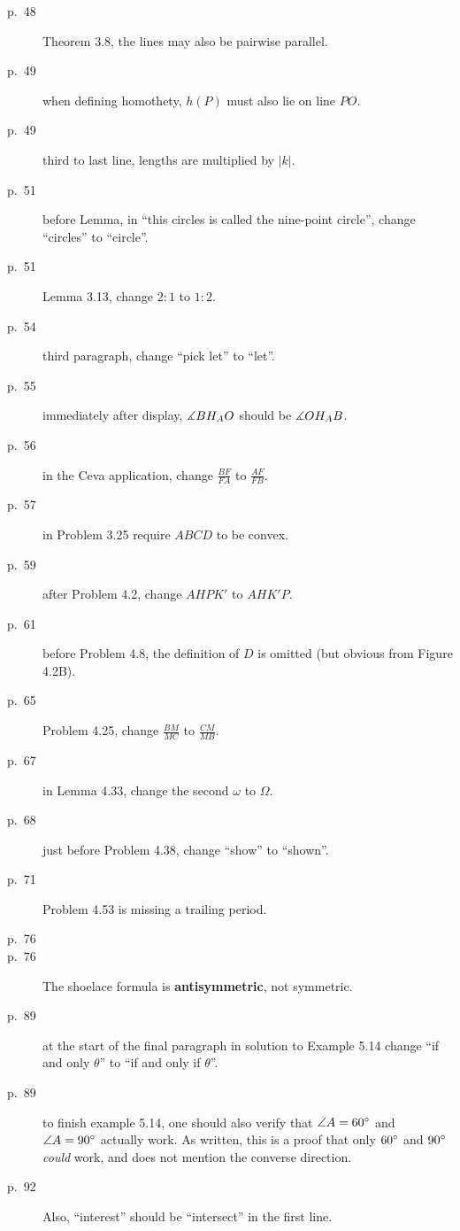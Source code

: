 \documentclass[11pt]{scrartcl}
\begin{document}
\begin{description}
\item[p.\  48] Theorem 3.8, the lines may also be pairwise parallel.
\item[p.\  49] when defining homothety, $h(P)$ must also lie on line $PO$.
\item[p.\  49] third to last line, lengths are multiplied by $|k|$.
\item[p.\  51] before Lemma, in ``this circles is called the nine-point circle'',
  change ``circles'' to ``circle''.
\item[p.\  51] Lemma 3.13, change $2:1$ to $1:2$.
\item[p.\  54] third paragraph, change ``pick let'' to ``let''.
\item[p.\  55] immediately after display, $\measuredangle BH_AO$ should be $\measuredangle OH_AB$.
\item[p.\  56] in the Ceva application, change $\frac{BF}{FA}$ to $\frac{AF}{FB}$.
\item[p.\  57] in Problem 3.25 require $ABCD$ to be convex.
\item[p.\  59] after Problem 4.2, change $AHPK'$ to $AHK'P$.
\item[p.\  61] before Problem 4.8, the definition of $D$ is omitted (but obvious from Figure 4.2B).
\item[p.\  65] Problem 4.25, change $\frac{BM}{MC}$ to $\frac{CM}{MB}$.
\item[p.\  67] in Lemma 4.33, change the second $\omega$ to $\Omega$.
\item[p.\  68] just before Problem 4.38, change ``show'' to ``shown''.
\item[p.\  71] Problem 4.53 is missing a trailing period.
\item[p.\  76] 
\item[p.\  76] The shoelace formula is \textbf{antisymmetric}, not symmetric.
\item[p.\  89] at the start of the final paragraph in solution to Example 5.14
  change ``if and only $\theta$'' to ``if and only if $\theta$''.
\item[p.\  89] to finish example 5.14, one should also verify that $\angle A = 60^\circ$
  and $\angle A = 90^\circ$ actually work.
  As written, this is a proof that only $60^\circ$ and $90^\circ$ \emph{could} work,
  and does not mention the converse direction.
\item[p.\  92] 
  Also, ``interest'' should be ``intersect'' in the first line.

\end{description}
\end{document}
